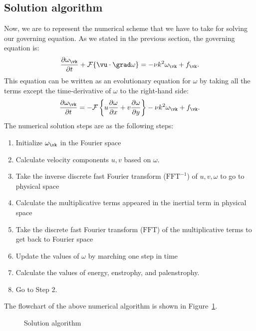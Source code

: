 \documentclass[12pt]{article}
\begin{document}
\subsection{Solution algorithm}
Now, we are to represent the numerical scheme that we have to take for solving our governing equation. As we stated in the previous section, the governing equation is:
\begin{equation}\label{governing}
\frac{\partial\omega_{\vk}}{\partial t} + \mathcal{F}\{\vu\cdot\grad\omega\}= -\nu{k}^2\omega_{\vk} + f_{\vk}.
\end{equation}
%
This equation can be written as an evolutionary equation for $\omega$ by taking all the terms except the time-derivative of $\omega$ to the right-hand side:
\begin{equation}\label{evolutionary}
\frac{\partial\omega_{\vk}}{\partial t} =- \mathcal{F}\left\lbrace u\dfrac{\partial \omega}{\partial x}+v\dfrac{\partial \omega}{\partial y}\right\rbrace -\nu k^2\omega_{\vk} + f_{\vk}.
\end{equation}
%
The numerical solution steps are as the following steps:
\begin{enumerate}
\item Initialize $\omega_{\vk}$ in the Fourier space
\item Calculate velocity components $u,v$ based on $\omega$.
\item Take the inverse discrete fast Fourier transform ($\text{FFT}^{-1}$) of $u,v,\omega$ to go to physical space
\item Calculate the multiplicative terms appeared in the inertial term in physical space
\item Take the discrete fast Fourier transform ($\text{FFT}$) of the multiplicative terms to get back to Fourier space
\item Update the values of $\omega$ by marching one step in time
\item Calculate the values of energy, enstrophy, and palenstrophy.
\item Go to Step 2.
\end{enumerate}
The flowchart of the above numerical algorithm is shown in Figure~\ref{algorithm}.
\begin{figure}[ht]
\begin{center}
\caption{Solution algorithm}\label{algorithm}
\end{center}
\end{figure}
\end{document}
